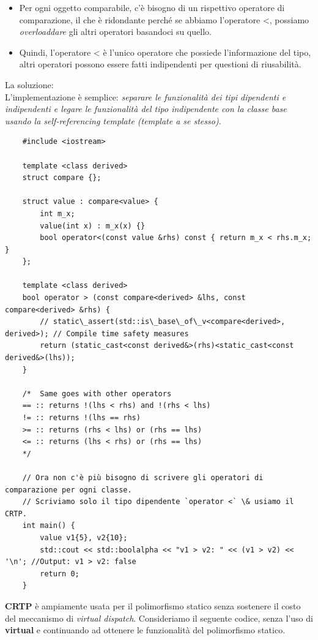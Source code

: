 \begin{itemize}
	\item \textsf{\small Per ogni oggetto comparabile, c'è bisogno di un rispettivo operatore di comparazione, il che è ridondante perché se abbiamo l'operatore <, possiamo \emph{overloaddare} gli altri operatori basandoci su quello.}
	\item \textsf{\small Quindi, l'operatore < è l'unico operatore che possiede l'informazione del tipo, altri operatori possono essere fatti indipendenti per questioni di riusabilità.}
\end{itemize}

\textsf{\small La soluzione: } \\

\textsf{\small L'implementazione è semplice: \emph{separare le funzionalità dei tipi dipendenti e indipendenti e legare le funzionalità del tipo indipendente con la classe base usando la \emph{self-referencing template} (template a se stesso)}.} \\

\begin{lstlisting}
	#include <iostream>
	
	template <class derived>
	struct compare {};
	
	struct value : compare<value> {
		int m_x;
		value(int x) : m_x(x) {}
		bool operator<(const value &rhs) const { return m_x < rhs.m_x; }
	};
	
	template <class derived>
	bool operator > (const compare<derived> &lhs, const compare<derived> &rhs) {
		// static\_assert(std::is\_base\_of\_v<compare<derived>, derived>); // Compile time safety measures
		return (static_cast<const derived&>(rhs)<static_cast<const derived&>(lhs));
	}
	
	/*  Same goes with other operators
	== :: returns !(lhs < rhs) and !(rhs < lhs)
	!= :: returns !(lhs == rhs)
	>= :: returns (rhs < lhs) or (rhs == lhs)
	<= :: returns (lhs < rhs) or (rhs == lhs) 
	*/
	
	// Ora non c'è più bisogno di scrivere gli operatori di comparazione per ogni classe.
	// Scriviamo solo il tipo dipendente `operator <` \& usiamo il CRTP.
	int main() {   
		value v1{5}, v2{10};
		std::cout << std::boolalpha << "v1 > v2: " << (v1 > v2) << '\n'; //Output: v1 > v2: false
		return 0;
	}
\end{lstlisting}

\textsf{\small \textbf{CRTP} è ampiamente usata per il polimorfismo statico senza sostenere il costo del meccanismo di \emph{virtual dispatch}. Consideriamo il seguente codice, senza l'uso di \textbf{virtual} e continuando ad ottenere le funzionalità del polimorfismo statico.} \\

